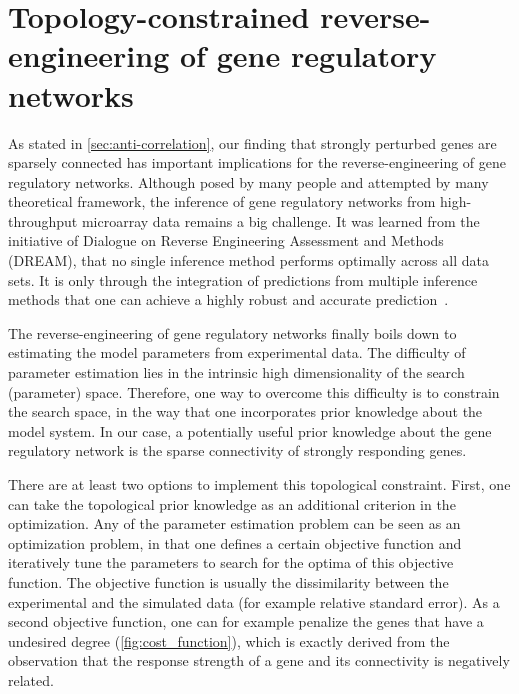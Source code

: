 \section{Topology-constrained reverse-engineering of gene regulatory networks}
As stated in \ref{sec:anti-correlation}, our finding that strongly perturbed 
genes are sparsely connected has important implications for the reverse-engineering
of gene regulatory networks. Although posed by many people and attempted by 
many theoretical framework, the inference of gene regulatory networks from 
high-throughput microarray data remains a big challenge. It was learned from
the initiative of Dialogue on Reverse Engineering Assessment and Methods (DREAM),
that no single inference method performs optimally across all data sets. 
It is only through the integration of predictions from multiple inference methods 
that one can achieve a highly robust and accurate prediction~\citep{Marbach2012}.

The reverse-engineering of gene regulatory networks finally boils down to 
estimating the model parameters from experimental data. The difficulty of
parameter estimation lies in the intrinsic high dimensionality of the search
(parameter) space. Therefore, one way to overcome this difficulty is to 
constrain the search space, in the way that one incorporates prior knowledge
about the model system. In our case, a potentially useful prior knowledge
about the gene regulatory network is the sparse connectivity of strongly 
responding genes.

There are at least two options to implement this topological constraint. 
First, one can take the topological prior knowledge as an additional
criterion in the optimization. Any of the parameter estimation problem
can be seen as an optimization problem, in that one defines a certain
objective function and iteratively tune the parameters to search for
the optima of this objective function. The objective function is usually the 
dissimilarity between the experimental and the simulated data (for example
relative standard error). As a second objective function, one can for example
penalize the genes that have a undesired degree (\ref{fig:cost_function}), 
which is exactly derived 
from the observation that the response strength of a gene and its connectivity
is negatively related.


